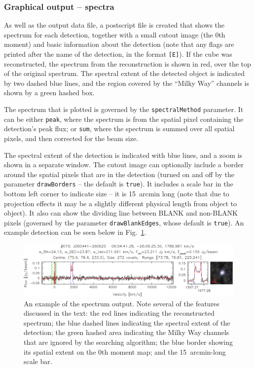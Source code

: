 \documentclass[12pt,a4paper]{article}
\begin{document}
\subsubsection{Graphical output -- spectra}

As well as the output data file, a postscript file is created that
shows the spectrum for each detection, together with a small cutout
image (the 0th moment) and basic information about the detection (note
that any flags are printed after the name of the detection, in the
format \texttt{[E]}). If the cube was reconstructed, the spectrum from
the reconstruction is shown in red, over the top of the original
spectrum. The spectral extent of the detected object is indicated by
two dashed blue lines, and the region covered by the ``Milky Way''
channels is shown by a green hashed box.

The spectrum that is plotted is governed by the
\texttt{spectralMethod} parameter. It can be either \texttt{peak},
where the spectrum is from the spatial pixel containing the
detection's peak flux; or \texttt{sum}, where the spectrum is summed
over all spatial pixels, and then corrected for the beam size.

The spectral extent of the detection is indicated with blue lines, and
a zoom is shown in a separate window. The cutout image can optionally
include a border around the spatial pixels that are in the detection
(turned on and off by the parameter \texttt{drawBorders} -- the
default is \texttt{true}). It includes a scale bar in the bottom left
corner to indicate size -- it is 15~arcmin long (note that due to
projection effects it may be a slightly different physical length from
object to object). It also can show the dividing line between BLANK
and non-BLANK pixels (governed by the parameter
\texttt{drawBlankEdges}, whose default is \texttt{true}). An example
detection can be seen below in Fig.~\ref{fig-spect}.

\begin{figure}[t]
\begin{center}
\includegraphics[width=\textwidth]{example_spectrum}
\end{center}
\caption{\footnotesize An example of the spectrum output. Note several
  of the features discussed in the text: the red lines indicating the
  reconstructed spectrum; the blue dashed lines indicating the
  spectral extent of the detection; the green hashed area indicating
  the Milky Way channels that are ignored by the searching algorithm;
  the blue border showing its spatial extent on the 0th moment map;
  and the 15~arcmin-long scale bar.}
\label{fig-spect}
\end{figure}
\end{document}
